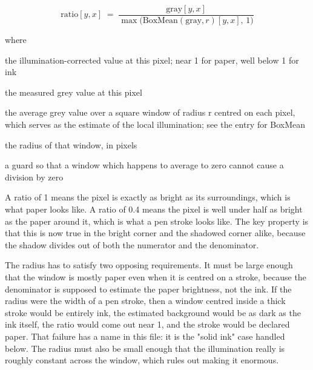 \begin{equation}
\mathrm{ratio}[y,x] \;=\; \frac{\mathrm{gray}[y,x]}{\max\big(\mathrm{BoxMean}(\mathrm{gray},r)[y,x],\,1\big)}
\end{equation}

\noindent where
\begin{description}[leftmargin=2.4em,style=nextline,font=\normalfont\ttfamily]\setlength\itemsep{1pt}
  \item[{$\mathrm{ratio}[y,x]$}] \normalfont the illumination-corrected value at this pixel; near 1 for paper, well below 1 for ink
  \item[{$\mathrm{gray}[y,x]$}] \normalfont the measured grey value at this pixel
  \item[{$\mathrm{BoxMean}(\mathrm{gray},r)$}] \normalfont the average grey value over a square window of radius r centred on each pixel, which serves as the estimate of the local illumination; see the entry for BoxMean
  \item[{$r$}] \normalfont the radius of that window, in pixels
  \item[{$\max(\cdot,\,1)$}] \normalfont a guard so that a window which happens to average to zero cannot cause a division by zero
\end{description}
A ratio of 1 means the pixel is exactly as bright as its surroundings, which is what paper looks like. A ratio of 0.4 means the pixel is well under half as bright as the paper around it, which is what a pen stroke looks like. The key property is that this is now true in the bright corner and the shadowed corner alike, because the shadow divides out of both the numerator and the denominator.


The radius has to satisfy two opposing requirements. It must be large enough that the window is mostly paper even when it is centred on a stroke, because the denominator is supposed to estimate the paper brightness, not the ink. If the radius were the width of a pen stroke, then a window centred inside a thick stroke would be entirely ink, the estimated background would be as dark as the ink itself, the ratio would come out near 1, and the stroke would be declared paper. That failure has a name in this file: it is the "solid ink" case handled below. The radius must also be small enough that the illumination really is roughly constant across the window, which rules out making it enormous.


